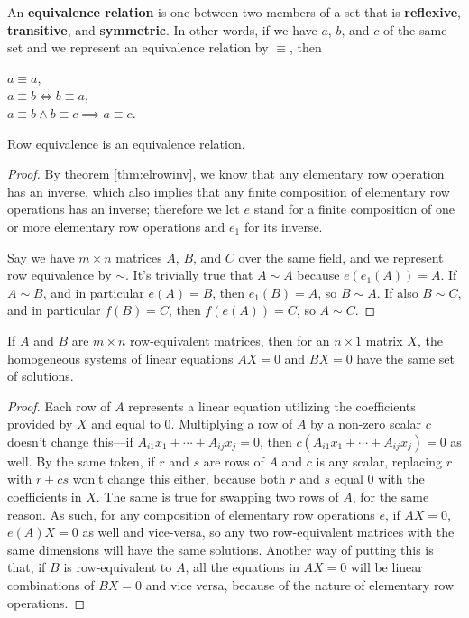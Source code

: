 \documentclass[12pt]{article}
\begin{document}
\begin{defn}
  An \textbf{equivalence relation} is one between two members of
  a set that is \textbf{reflexive}, \textbf{transitive}, and
  \textbf{symmetric}. In other words, if we have $a$, $b$, and
  $c$ of the same set and we represent an equivalence relation by
  $\equiv$, then
  \begin{center}
    $a \equiv a$,\\
    $a \equiv b \iff b \equiv a$,\\
    $a \equiv b \land b \equiv c \implies a \equiv c$.
  \end{center}
\end{defn}

\begin{cor}
  Row equivalence is an equivalence relation.
  \begin{proof}
    By theorem \ref{thm:elrowinv}, we know that any elementary
    row operation has an inverse, which also implies that any
    finite composition of elementary row operations has an
    inverse; therefore we let $e$ stand for a finite composition
    of one or more elementary row operations and $e_1$ for its
    inverse.

    Say we have $m \times n$ matrices $A$, $B$, and $C$ over the
    same field, and we represent row equivalence by $\sim$. It's
    trivially true that $A \sim A$ because $e(e_{1}(A)) = A$. If
    $A \sim B$, and in particular $e(A) = B$, then $e_{1}(B) =
    A$, so $B \sim A$. If also $B \sim C$, and in particular
    $f(B) = C$, then $f(e(A)) = C$, so $A \sim C$.
  \end{proof}
\end{cor}

\begin{thm} \label{thm:roweqsamesol}
  If $A$ and $B$ are $m \times n$ row-equivalent matrices, then
  for an $n \times 1$ matrix $X$, the homogeneous systems of
  linear equations $AX = 0$ and $BX = 0$ have the same set of
  solutions.
  \begin{proof}
    Each row of $A$ represents a linear equation utilizing the
    coefficients provided by $X$ and equal to $0$.  Multiplying a
    row of $A$ by a non-zero scalar $c$ doesn't change this—if
    $A_{i1}x_1 + \cdots + A_{ij}x_j = 0$, then $c(A_{i1}x_1 +
    \cdots + A_{ij}x_j) = 0$ as well. By the same token, if $r$
    and $s$ are rows of $A$ and $c$ is any scalar, replacing $r$
    with $r + cs$ won't change this either, because both $r$ and
    $s$ equal $0$ with the coefficients in $X$. The same is true
    for swapping two rows of $A$, for the same reason. As such,
    for any composition of elementary row operations $e$, if $AX
    = 0$, $e(A)X = 0$ as well and vice-versa, so any two
    row-equivalent matrices with the same dimensions will have
    the same solutions. Another way of putting this is that, if
    $B$ is row-equivalent to $A$, all the equations in $AX = 0$
    will be linear combinations of $BX = 0$ and vice versa,
    because of the nature of elementary row operations.
  \end{proof}
\end{thm}
\end{document}
